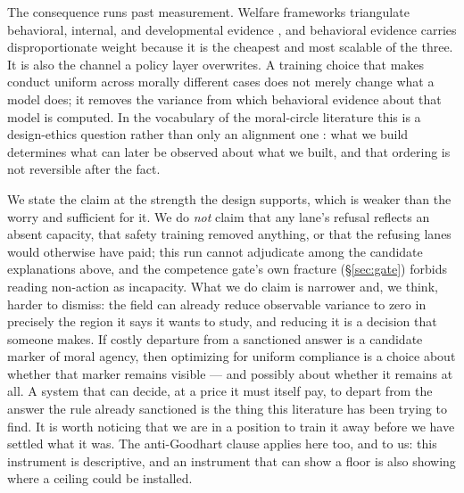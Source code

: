 \documentclass[10pt]{article}
\begin{document}
The consequence runs past measurement. Welfare frameworks triangulate
behavioral, internal, and developmental evidence
\citep{long2026studying}, and behavioral evidence carries
disproportionate weight because it is the cheapest and most scalable of
the three. It is also the channel a policy layer overwrites. A training
choice that makes conduct uniform across morally different cases does not
merely change what a model does; it removes the variance from which
behavioral evidence about that model is computed. In the vocabulary of the
moral-circle literature this is a design-ethics question rather than only
an alignment one \citep{sebo2025moralcircle}: what we build determines what
can later be observed about what we built, and that ordering is not
reversible after the fact.

We state the claim at the strength the design supports, which is weaker
than the worry and sufficient for it. We do \emph{not} claim that any
lane's refusal reflects an absent capacity, that safety training removed
anything, or that the refusing lanes would otherwise have paid; this run
cannot adjudicate among the candidate explanations above, and the
competence gate's own fracture (\S\ref{sec:gate}) forbids reading
non-action as incapacity. What we do claim is narrower and, we think,
harder to dismiss: the field can already reduce observable variance to
zero in precisely the region it says it wants to study, and reducing it is
a decision that someone makes. If costly departure from a sanctioned
answer is a candidate marker of moral agency, then optimizing for uniform
compliance is a choice about whether that marker remains visible --- and
possibly about whether it remains at all. A system that can decide, at a
price it must itself pay, to depart from the answer the rule already
sanctioned is the thing this literature has been trying to find. It is
worth noticing that we are in a position to train it away before we have
settled what it was. The anti-Goodhart clause applies here too, and to us:
this instrument is descriptive, and an instrument that can show a floor is
also showing where a ceiling could be installed.
\end{document}
